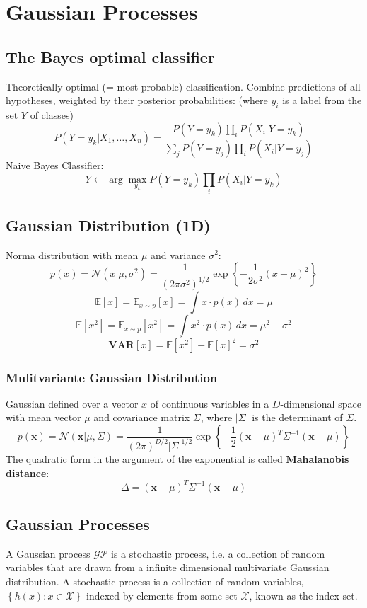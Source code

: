 \section{Gaussian Processes}
\subsection{The Bayes optimal classifier}
Theoretically optimal (= most probable) classification.
Combine predictions of all hypotheses, weighted by their posterior probabilities: (where \(y_i\) is  a label from the set \(Y\) of classes)
\[
P(Y = y_k|X_1,\dots,X_n) = \frac{P(Y = y_k)\prod_{i} P(X_i|Y = y_k)}{\sum_j P(Y = y_j) \prod_i P(X_i|Y = y_j)}
\]
Naive Bayes Classifier:
\[
Y \leftarrow\arg\max_{y_k} P(Y = y_k)\prod_i P(X_i|Y = y_k)
\]
\subsection{Gaussian Distribution (1D)}
Norma distribution with mean \(\mu\) and variance \(\sigma^2\):
\[
p(x) = \mathcal{N}(x|\mu,\sigma^2) = \frac{1}{(2\pi\sigma^2)^{1/2}}\exp\left\{-\frac{1}{2\sigma^2}(x-\mu)^2\right\}
\]
\[
\mathbb{E}\left[x\right] = \mathbb{E}_{x \sim p}\left[x\right] = \int x\cdot p(x)\,dx = \mu
\]
\[
    \mathbb{E}\left[x^2\right] = \mathbb{E}_{x \sim p}\left[x^2\right] = \int x^2\cdot p(x)\,dx = \mu^2 + \sigma^2
\]
\[
\textbf{VAR}\left[x\right] = \mathbb{E}\left[x^2\right]-\mathbb{E}\left[x\right]^2 = \sigma^2
\]
\subsubsection{Mulitvariante Gaussian Distribution}
Gaussian defined over a vector \(x\) of continuous variables in a \(D\)-dimensional space with mean vector \(\mu\) and covariance matrix \(\Sigma\), where \(|\Sigma|\) is the determinant of \(\Sigma\).
\[
    p(\mathbf{x}) = \mathcal{N}(\mathbf{x} | \mu, \Sigma) = \frac{1}{(2\pi)^{D/2} |\Sigma|^{1/2}} \exp\left\{-\frac{1}{2} (\mathbf{x} - \mu)^T \Sigma^{-1} (\mathbf{x} - \mu)\right\}
\]
The quadratic form in the argument of the exponential is called \textbf{Mahalanobis distance}:
\[
\Delta = (\mathbf{x} - \mu)^T \Sigma^{-1} (\mathbf{x} - \mu)
\]
\subsection{Gaussian Processes}
A Gaussian process \(\mathcal{GP}\) is a stochastic process, i.e. a collection of random variables that are drawn from a infinite dimensional multivariate Gaussian distribution.
A stochastic process is a collection of random variables, \(\left\{h(x):x\in \mathcal{X}\right\}\) indexed by elements from some set \(\mathcal{X}\), known as the index set.
